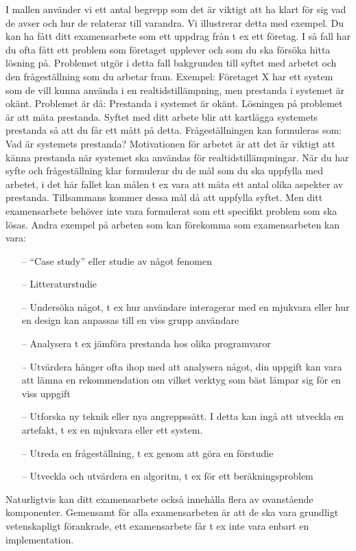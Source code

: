 \documentclass[10pt, titlepage, a4paper, times]{article}
\begin{document}
I mallen anv\"{a}nder vi ett antal begrepp som det \"{a}r viktigt att ha klart f\"{o}r sig vad de avser och hur de relaterar till varandra. Vi illustrerar detta med exempel.
Du kan ha f\r{a}tt ditt examensarbete som ett uppdrag fr\r{a}n t ex ett f\"{o}retag. I s\r{a} fall har du ofta f\r{a}tt ett problem som f\"{o}retaget upplever och som du ska f\"{o}rs\"{o}ka hitta l\"{o}sning p\r{a}. Problemet utg\"{o}r i detta fall bakgrunden till syftet med arbetet och den fr\r{a}gest\"{a}llning som du arbetar fram.
Exempel: F\"{o}retaget X har ett system som de vill kunna anv\"{a}nda i en realtidstill\"{a}mpning, men prestanda i systemet \"{a}r ok\"{a}nt. Problemet \"{a}r d\r{a}: Prestanda i systemet \"{a}r ok\"{a}nt. L\"{o}sningen p\r{a} problemet \"{a}r att m\"{a}ta prestanda. Syftet med ditt arbete blir att kartl\"{a}gga systemets prestanda s\r{a} att du f\r{a}r ett m\r{a}tt p\r{a} detta. Fr\r{a}gest\"{a}llningen kan formuleras som: Vad \"{a}r systemets prestanda? Motivationen f\"{o}r arbetet \"{a}r att det \"{a}r viktigt att k\"{a}nna prestanda n\"{a}r systemet ska anv\"{a}ndas f\"{o}r realtidstill\"{a}mpningar. N\"{a}r du har syfte och fr\r{a}gest\"{a}llning klar formulerar du de m\r{a}l som du ska uppfylla med arbetet, i det h\"{a}r fallet kan m\r{a}len t ex vara att m\"{a}ta ett antal olika aspekter av prestanda. Tillsammans kommer dessa m\r{a}l d\r{a} att uppfylla syftet. 
Men ditt examensarbete beh\"{o}ver inte vara formulerat som ett specifikt problem som ska l\"{o}sas. Andra exempel p\r{a} arbeten som kan f\"{o}rekomma som examensarbeten kan vara:
\begin{itemize}
\item[--]	``Case study'' eller studie av n\r{a}got fenomen
\item[--]	Litteraturstudie
\item[--]	Unders\"{o}ka n\r{a}got, t ex hur anv\"{a}ndare interagerar med en mjukvara eller hur en design kan anpassas till en viss grupp anv\"{a}ndare
\item[--]	Analysera t ex j\"{a}mf\"{o}ra prestanda hos olika programvaror
\item[--]	Utv\"{a}rdera h\"{a}nger ofta ihop med att analysera n\r{a}got, din uppgift kan vara att l\"{a}mna en rekommendation om vilket verktyg som b\"{a}st l\"{a}mpar sig f\"{o}r en viss uppgift
\item[--]	Utforska ny teknik eller nya angreppss\"{a}tt. I detta kan ing\r{a} att utveckla en artefakt, t ex en mjukvara eller ett system. 
\item[--]	Utreda en fr\r{a}gest\"{a}llning, t ex genom att g\"{o}ra en f\"{o}rstudie
\item[--]	Utveckla och utv\"{a}rdera en algoritm, t ex f\"{o}r ett ber\"{a}kningsproblem
\end{itemize}
Naturligtvis kan ditt examensarbete ocks\r{a} inneh\r{a}lla flera av ovanst\r{a}ende komponenter. Gemensamt f\"{o}r alla examensarbeten \"{a}r att de ska vara grundligt vetenskapligt f\"{o}rankrade, ett examensarbete f\r{a}r t ex inte vara enbart en implementation.
\end{document}
